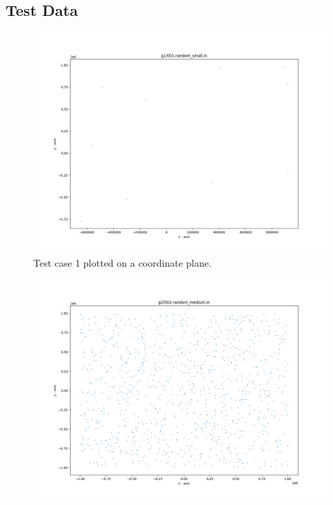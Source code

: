 \documentclass{article}
\begin{document}
\begin{appendices}
    


\section{Test Data}
\label{appendix:TestData}


\begin{figure}[H]
	\centering
	\includegraphics[scale=0.5]{code/visualizer/testdata/01.png}
	\caption{Test case 1 plotted on a coordinate plane.}
	\label{fig:01}
\end{figure}
\begin{figure}[H]
	\centering
	\includegraphics[scale=0.5]{code/visualizer/testdata/02.png}

\end{figure}
\end{appendices}
\end{document}
